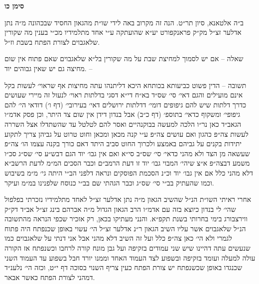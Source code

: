 \documentclass[12pt, openany]{book}
\newcommand{\chapname}{}
\newcommand{\newchap}[1]{
	\addcontentsline{toc}{chapter}{#1}
	\renewcommand{\chapname}{#1}
		\begin{center}
			\textbf{%
\fontsize{16pt}{16pt}\selectfont
				#1}
		\end{center}
}
\begin{document}
\newchap{סימן כו}
\begin{multicols}{2}
ב״ה אלטאנא, סיון תר״ט. הנה זה מקרוב באה לידי שו״ת מהגאון החסיד שבכהונה מ״ה נתן אדלער זצ״ל מק״ק פראנקפורט יע״א שהועתקה ע״י אחד מתלמידיו מכ״י בענין מה שקורין שלאגבוים לצורת הפתח בשבת וז״ל.\\\vspace{0pt}

שאלה – אם יש לסמוך למחיצת שבת על מה שקורין בל״א שלאגבוים שאם פתוח אין שום מחיצה גם יש שאין גבוהים יוד. –\\\vspace{0pt}

תשובה – הדין פשוט כביעותא בכותחא היכא דליתנהו עתה מחיצות אף שראוי׳ לעשות בקל אינם מועילים והגם דאי׳ סי׳ שס״ד בא״ח די״א דסגי בדלתות ראוי׳ לנעול זה מיירי שעושים כדרך דלתות שיש להם גיפופים דומי׳ דדלתות ירושלים דאי׳ בעירובי׳ (דף ו׳) דודאי הי׳ להם גיפופי׳ ומשקוף כדאי׳ בתוספ׳ (דף כ״ב) אבל בנדון דידן אין שום צד היתר, וכן פסק אדמ״ו הגאב״ד כאן נר״ו הלכה למעשה בבוקנהיים ואסר להם לטלטל עד שהשתדלו אצל השררה לעשות צה״פ כהגון ואם עושים צה״פ ע״י קנה מכאן ומכאן וחוט טרוט על גביהן צריך לתקוע יתידות בקנים על גביהם באמצע ולכרוך החוט סביב היתד דאם כורך בקנה עצמו הו׳ צה״פ שעשאה מן הצד ולא מהני כדאי׳ סי׳ שס״ב סי״א ואם אין גבו׳ יוד הגם דבש״ע סי׳ שס״ג סכ״ו משמע דבצה״פ א״צ שיהי׳ המבוי גבו׳ יוד זו דעת הרמב״ם וכבר הסכים המ״מ לדעת הרשב״א דלא מהני כלל אם אין גבו׳ יוד וכ״נ הסכמת הפוסקים ונראה דלפני הב״י היתה גי׳ מ״מ בשיבוש וכמו שהעתיק בב״י סי׳ שס״ג וכבר הגהתי שם בב״י כנוסח שלפנינו במ״מ ועיקר.\\\vspace{0pt}

אחרי ראיתי השו״ת הנ״ל שהשיב הגאון מ״ה נתן אדלער זצ״ל לאחד מתלמידיו נזכרתי בפלפול שהי׳ לי בנדון כיוצא בזה עם אדמ״ו הרב הגאון הגדול מ״ה אברהם בינג זצ״ל אב״ד דק״ק ווירצבורג בימי בחרותי בשנת תקפ״א. והנני מעתיקו בכאן, רק אזכיר שכפי הנראה מהתשובה הנ״ל שלאגבוים אשר עליו השיב הגאון ר״נ אדלער זצ״ל הי׳ עשוי באופן שכנפתח היה פתוח לגמרי ולא הי׳ כאן צה״פ כלל ועל זה השיב דלא מהני אבל אני דנתי על שלאגבוים כמו שנעשים עתה דהיינו שיש שני עמודים בזקיפה ועל גבן מונח קורה לרחבו וכשנפתח אז הקורה עולה למעלה ועומד בזקיפה ובשפוע לצד העמוד האחד וממנו יורד חבל בשפוע עד העמוד השני שכנגדו באופן שכשנפתח יש צורת הפתח כעין צריף השנוי בסוכה דף י״ט, וכזה הי׳ נלענ״ד דמהני לצורת הפתח כאשר אבאר.\\\vspace{0pt}


\end{multicols}
\end{document}
